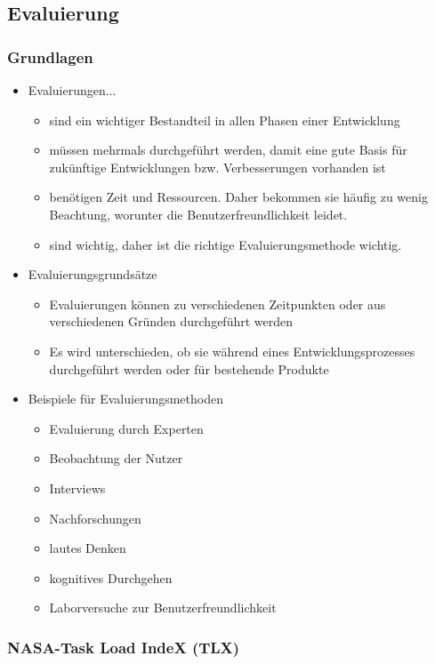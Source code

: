 \documentclass[paper=a4, fontsize=11pt]{scrartcl} %
\numberwithin{equation}{section} %
\numberwithin{figure}{section} %
\numberwithin{table}{section} %
\begin{document}
\subsection{Evaluierung}

\subsubsection{Grundlagen}

\begin{itemize}
\item Evaluierungen...
\begin{itemize}
\item sind ein wichtiger Bestandteil in allen Phasen einer Entwicklung
\item müssen mehrmals durchgeführt werden, damit eine gute Basis für zukünftige Entwicklungen bzw. Verbesserungen vorhanden ist
\item benötigen Zeit und Ressourcen. Daher bekommen sie häufig zu wenig Beachtung, worunter die Benutzerfreundlichkeit leidet.
\item sind wichtig, daher ist die richtige Evaluierungsmethode wichtig.
\end{itemize}
\item Evaluierungsgrundsätze
\begin{itemize}
\item Evaluierungen können zu verschiedenen Zeitpunkten oder aus verschiedenen Gründen durchgeführt werden
\item Es wird unterschieden, ob sie während eines Entwicklungsprozesses durchgeführt werden oder für bestehende Produkte
\end{itemize}
\item Beispiele für Evaluierungsmethoden
\begin{itemize}
\item Evaluierung durch Experten
\item Beobachtung der Nutzer
\item Interviews
\item Nachforschungen
\item lautes Denken
\item kognitives Durchgehen
\item Laborversuche zur Benutzerfreundlichkeit
\end{itemize}
\end{itemize}

\subsubsection{NASA-Task Load IndeX (TLX)}
\end{document}
